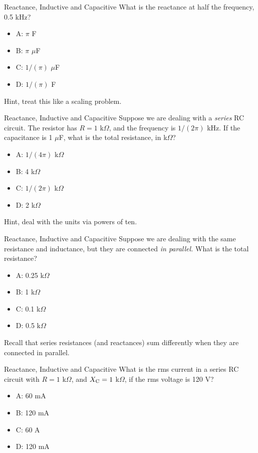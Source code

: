 \documentclass{beamer}
\begin{document}
\begin{frame}{Reactance, Inductive and Capacitive}
What is the reactance at half the frequency, 0.5 kHz?
\begin{itemize}
\item A: $\pi$ F
\item B: $\pi$ $\mu$F
\item C: $1/(\pi)$ $\mu$F
\item D: $1/(\pi)$ F
\end{itemize}
\footnotesize
Hint, treat this like a scaling problem.
\end{frame}

\begin{frame}{Reactance, Inductive and Capacitive}
Suppose we are dealing with a \textit{series} RC circuit.  The resistor has $R = 1$ k$\Omega$, and the frequency is $1/(2\pi)$ kHz.  If the capacitance is 1 $\mu$F, what is the total resistance, in k$\Omega$?
\begin{itemize}
\item A: $1/(4\pi)$ k$\Omega$
\item B: 4 k$\Omega$
\item C: $1/(2\pi)$ k$\Omega$
\item D: 2 k$\Omega$
\end{itemize}
\footnotesize
Hint, deal with the units via powers of ten.
\end{frame}

\begin{frame}{Reactance, Inductive and Capacitive}
Suppose we are dealing with the same resistance and inductance, but they are connected \textit{in parallel.}  What is the total resistance?
\begin{itemize}
\item A: 0.25 k$\Omega$
\item B: 1 k$\Omega$
\item C: 0.1 k$\Omega$
\item D: 0.5 k$\Omega$
\end{itemize}
\footnotesize
Recall that series resistances (and reactances) sum differently when they are connected in parallel.
\end{frame}

\begin{frame}{Reactance, Inductive and Capacitive}
What is the rms current in a series RC circuit with $R = 1$ k$\Omega$, and $X_{\rm C} = 1$ k$\Omega$, if the rms voltage is 120 V?
\begin{itemize}
\item A: 60 mA
\item B: 120 mA
\item C: 60 A
\item D: 120 mA
\end{itemize}
\end{frame}
\end{document}
